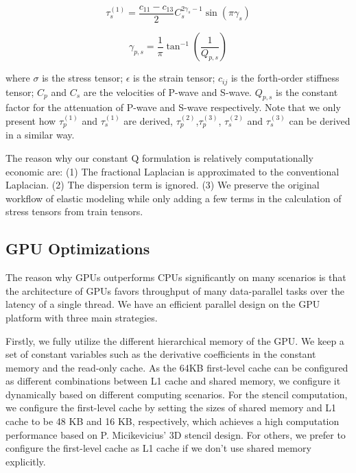 \documentclass{paris17}
\begin{document}
\begin{equation}
  \tau_s^{(1)} = \frac{c_{11} - c_{13}}{2}C_s^{2\gamma_s - 1}\sin(\pi \gamma_s)
\end{equation}

\begin{equation}
  \gamma_{p,s}=\frac{1}{\pi}\tan^{-1}(\frac{1}{Q_{p,s}})
\end{equation}

where $\sigma$ is the stress tensor; $\epsilon$ is the strain tensor; $c_{ij}$ is the forth-order stiffness tensor; $C_p$ and $C_s$ are the velocities of P-wave and S-wave. $Q_{p,s}$ is the constant factor for the attenuation of P-wave and S-wave respectively. Note that we only present how $\tau_p^{(1)}$ and $\tau_s^{(1)}$ are derived, $\tau_p^{(2)}$,$\tau_p^{(3)}$, $\tau_s^{(2)}$ and $\tau_s^{(3)}$ can be derived in a similar way.

The reason why our constant Q formulation is relatively computationally economic are: (1) The fractional Laplacian is approximated to the conventional Laplacian. (2) The dispersion term is ignored. (3) We preserve the original workflow of elastic modeling while only adding a few terms in the calculation of stress tensors from train tensors.

\subsection{GPU Optimizations}

The reason why GPUs outperforms CPUs significantly on many scenarios is that the architecture of GPUs favors throughput of many data-parallel tasks over the latency of a single thread. We have an efficient parallel design on the GPU platform with three main strategies.

Firstly, we fully utilize the different hierarchical memory of the GPU. We keep a set of constant variables such as the derivative coefficients in the constant memory and the read-only cache. As the 64KB first-level cache can be configured as different combinations between L1 cache and shared memory, we configure it dynamically based on different computing scenarios. For the stencil computation, we configure the first-level cache by setting the sizes of shared memory and L1 cache to be 48 KB and 16 KB, respectively, which achieves a high computation performance based on P. Micikevicius’ 3D stencil design. For others, we prefer to configure the first-level cache as L1 cache if we don't use shared memory explicitly.
\end{document}
